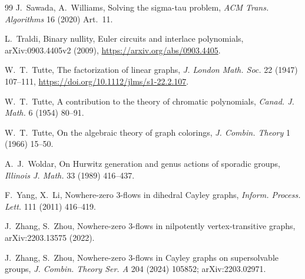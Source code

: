 \documentclass[11pt,a4paper]{article}
\theoremstyle{definition}
\theoremstyle{remark}
\begin{document}
\begin{thebibliography}{99}
 J.~Sawada, A.~Williams, Solving the sigma-tau problem, \emph{ACM Trans. Algorithms} 16 (2020) Art.~11.

 L.~Traldi, Binary nullity, Euler circuits and interlace polynomials, arXiv:0903.4405v2 (2009), \url{https://arxiv.org/abs/0903.4405}.

 W.~T.~Tutte, The factorization of linear graphs, \emph{J. London Math. Soc.} 22 (1947) 107--111, \url{https://doi.org/10.1112/jlms/s1-22.2.107}.

 W.~T.~Tutte, A contribution to the theory of chromatic polynomials, \emph{Canad. J. Math.} 6 (1954) 80--91.

 W.~T.~Tutte, On the algebraic theory of graph colorings, \emph{J. Combin. Theory} 1 (1966) 15--50.

 A.~J.~Woldar, On Hurwitz generation and genus actions of sporadic groups, \emph{Illinois J. Math.} 33 (1989) 416--437.

 F.~Yang, X.~Li, Nowhere-zero 3-flows in dihedral Cayley graphs, \emph{Inform. Process. Lett.} 111 (2011) 416--419.

 J.~Zhang, S.~Zhou, Nowhere-zero 3-flows in nilpotently vertex-transitive graphs, arXiv:2203.13575 (2022).

 J.~Zhang, S.~Zhou, Nowhere-zero 3-flows in Cayley graphs on supersolvable groups, \emph{J. Combin. Theory Ser. A} 204 (2024) 105852; arXiv:2203.02971.

\end{thebibliography}
\end{document}
